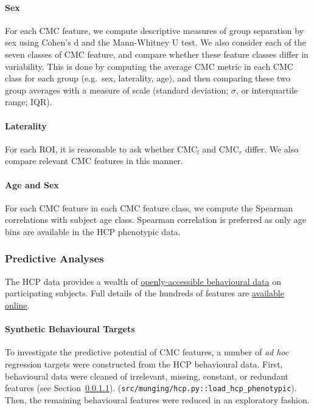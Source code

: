 \documentclass{article}
\begin{document}
\paragraph{Sex} For each CMC feature, we compute descriptive measures of
group separation by sex using Cohen's d and the Mann-Whitney U test. We also
consider each of the seven classes of CMC feature, and compare whether these
feature classes differ in variability. This is done by computing the average
CMC metric in each CMC class for each group (e.g.\ sex, laterality, age), and
then comparing these two group averages with a measure of scale (standard
deviation; \(\sigma\), or interquartile range; IQR).

\paragraph{Laterality} For each ROI, it is reasonable to ask whether
\(\text{CMC}_l\) and \(\text{CMC}_r\) differ. We also compare relevant CMC
features in this manner.

\paragraph{Age and Sex} For each CMC feature in each CMC feature class, we
compute the Spearman correlations with subject age class. Spearman
correlation is preferred as only age bins are available in the HCP phenotypic
data.



\subsubsection{Predictive Analyses}

The HCP data provides a wealth of
\href{https://www.humanconnectome.org/study/hcp-young-adult/document/wu-minn-hcp-consortium-open-access-data-use-terms}{openly-accessible
behavioural data} on participating subjects. Full details of the hundreds of
features are
\href{https://wiki.humanconnectome.org/docs/HCP-YA%20Data%20Dictionary-%20Updated%20for%20the%201200%20Subject%20Release.html}{available
online}.

\paragraph{Synthetic Behavioural Targets} \label{sec:cleaning}

To investigate the predictive potential of CMC features, a number of \emph{ad
hoc} regression targets were constructed from the HCP behavioural data.
First, behavioural data were cleaned of irrelevant, missing, constant, or
redundant features (see Section~\ref{sec:cleaning}).
(\texttt{src/munging/hcp.py::load\_hcp\_phenotypic}). Then, the remaining
behavioural features were reduced in an exploratory fashion.
\end{document}
